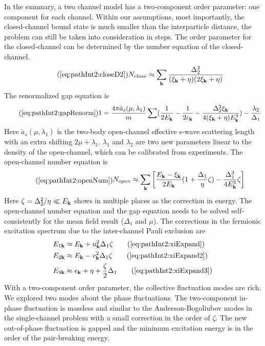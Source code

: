       In the summary, a two channel model has a two-component order parameter: one component for each channel.  Within our assumptions, most importantly, the closed-channel bound state is much smaller than the interparticle distance, the problem can still be taken into consideration in steps.  The order parameter for the closed-channel can be determined by the number equation of the closed-channel.
\begin{equation}\tag{\ref{eq:pathInt2:closeD2}}
N_{close}\approx\sum_{\vk}\frac{\Delta_{2}^2}{(\xi_{\vk}+\eta)(2\xi_{\vk}+\eta)}
\end{equation}
 The renormalized gap equation is 
 \begin{equation}\tag{\ref{eq:pathInt2:gapRenorm}}
1=\frac{4\pi{\tilde{a}_{s}(\mu,\lambda_{1})}}{m}\sum(\nth{2E_{\vk}}-\nth{2\epsilon_{\vk}}-\frac{\Delta_{2}^{2}\xi_{\vk}}{4(\xi_{\vk}+\eta){E_{\vk}^{3}}})
	-\frac{\lambda_{2}}{\Delta_{1}}
\end{equation}
Here $\tilde{a}_{s}(\mu,\lambda_{1})$ is the two-body open-channel effective  s-wave scattering length with  an extra shifting $2\mu+\lambda_{1}$.   $\lambda_{1}$ and $\lambda_{2}$ are two new parameters linear to the density of the open-channel, which can be calibrated from  experiments.  The open-channel number equation is 
\begin{equation}\tag{\ref{eq:pathInt2:openNum}}
\begin{split}
N_{open}\approx\sum_\vk\mbr{\frac{E_\vk-\xi_\vk}{2E_\vk}(1+\frac{\Delta_{1}}{\eta}\zeta)-\frac{\Delta_{1}^{3}}{4E_\vk^{3}}\zeta
	}	
\end{split}
\end{equation}
Here $\zeta=\Delta_{2}^{2}/\eta\ll{}E_{\mathbf{k}}$ shows in multiple places as the correction in energy.  The open-channel number equation and the gap equation needs to be solved self-consistently for the mean field result ($\Delta_{1}$ and $\mu$).  The corrections in the fermionic excitation spectrum due to the inter-channel Pauli exclusion are
\begin{align}
E_{1\vk}&\approx{}E_{\vk}+u_{\vk}^{2}\Delta_{1}\zeta\tag{\ref{eq:pathInt2:xiExpand}}\\
E_{2\vk}&\approx{}E_{\vk}-v_{\vk}^{2}\Delta_{1}\zeta\tag{\ref{eq:pathInt2:xiExpand2}}\\
E_{3\vk}&\approx{}\epsilon_{\vk}+\eta+\frac{\zeta}{2}\Delta_{1}
\tag{\ref{eq:pathInt2:xiExpand3}}
\end{align}
With a two-component order parameter, the collective fluctuation modes are rich.  We explored two modes about the phase fluctuations.  The two-component in-phase fluctuation is massless and similar to the Anderson-Bogoliubov modes in the single-channel problem with a small correction in the order of $\zeta$.  The new out-of-phase fluctuation is gapped and the minimum excitation energy is in the order of the pair-breaking energy.  

